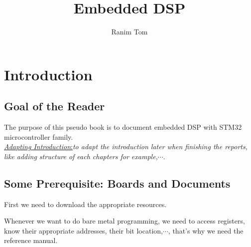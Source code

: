 \documentclass[12pt,a4paper]{book}
\title{Embedded DSP}
\author{Ranim Tom}
\begin{document}
% 







\maketitle

\tableofcontents



\printnomenclature




\listoftodos


\pagestyle{fancy}
\fancyhf{} %
\rhead{\rightmark}




\chapter{Introduction}

\section{Goal of the Reader}

The purpose of this pseudo book is to document embedded DSP with STM32 microcontroller family.\\

 \underline{\textit{Adapting Introduction}:}\textit{to adapt the introduction later when finishing the reports, like adding structure of each chapters for example,$\cdots$}.

\section{Some Prerequisite: Boards and Documents}

First we need to download the appropriate resources.

Whenever we want to do bare metal programming, we need to access registers, know their appropriate addresses, their bit location,$\cdots$, that's why we need the reference manual.\\
\end{document}
